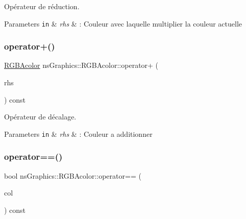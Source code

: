Opérateur de réduction. 


\begin{DoxyParams}[1]{Parameters}
\mbox{\tt in}  & {\em rhs} & \+: Couleur avec laquelle multiplier la couleur actuelle \\
\hline
\end{DoxyParams}
\mbox{\label{classns_graphics_1_1_r_g_b_acolor_abb3832c60bec568d1b357955e6be2300}} 
\subsubsection{\texorpdfstring{operator+()}{operator+()}}
{\footnotesize\ttfamily \hyperlink{classns_graphics_1_1_r_g_b_acolor}{R\+G\+B\+Acolor} ns\+Graphics\+::\+R\+G\+B\+Acolor\+::operator+ (\begin{DoxyParamCaption}\item[{const \hyperlink{classns_graphics_1_1_r_g_b_acolor}{R\+G\+B\+Acolor} \&}]{rhs }\end{DoxyParamCaption}) const}



Opérateur de décalage. 


\begin{DoxyParams}[1]{Parameters}
\mbox{\tt in}  & {\em rhs} & \+: Couleur a additionner \\
\hline
\end{DoxyParams}
\mbox{\label{classns_graphics_1_1_r_g_b_acolor_a685b4a48d19594bd29f136e1f74fee85}} 
\subsubsection{\texorpdfstring{operator==()}{operator==()}}
{\footnotesize\ttfamily bool ns\+Graphics\+::\+R\+G\+B\+Acolor\+::operator== (\begin{DoxyParamCaption}\item[{const \hyperlink{classns_graphics_1_1_r_g_b_acolor}{R\+G\+B\+Acolor} \&}]{col }\end{DoxyParamCaption}) const}



